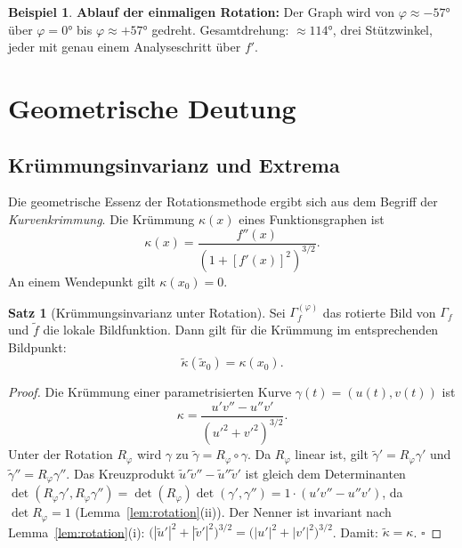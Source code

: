 ﻿\documentclass[12pt, a4paper]{article}
\theoremstyle{definition}
\newtheorem{satz}{Satz}[section]
\newtheorem{beispiel}{Beispiel}[section]
\begin{document}
\begin{beispiel}
		\textbf{Ablauf der einmaligen Rotation:}
		Der Graph wird von $\varphi \approx -57 °$ über $\varphi = 0 °$ bis
		$\varphi \approx +57 °$ gedreht. Gesamtdrehung: $\approx 114 °$,
		drei Stützwinkel, jeder mit genau einem Analyseschritt über $f'$.
	\end{beispiel}
	
	\section{Geometrische Deutung}
	
	\subsection{Krümmungsinvarianz und Extrema}
	
	Die geometrische Essenz der Rotationsmethode ergibt sich aus dem Begriff der
	\emph{Kurvenkrimmung}. Die Krümmung $\kappa(x)$ eines Funktionsgraphen ist
	\[
	\kappa(x) = \frac{f''(x)}{\left(1 + [f'(x)]^2\right)^{3/2}}.
	\]
	An einem Wendepunkt gilt $\kappa(x_0) = 0$.
	
	\begin{satz}[Krümmungsinvarianz unter Rotation]
		\label{satz:kruemmung}
		Sei $\Gamma_f^{(\varphi)}$ das rotierte Bild von $\Gamma_f$ und $\tilde{f}$
		die lokale Bildfunktion. Dann gilt für die Krümmung im entsprechenden Bildpunkt:
		\[
		\tilde{\kappa}(\tilde{x}_0) = \kappa(x_0).
		\]
	\end{satz}
	
	\begin{proof}
		Die Krümmung einer parametrisierten Kurve $\gamma(t) = (u(t), v(t))$ ist
		\[
		\kappa = \frac{u'v'' - u''v'}{(u'^2 + v'^2)^{3/2}}.
		\]
		Unter der Rotation $R_\varphi$ wird $\gamma$ zu $\tilde{\gamma} = R_\varphi \circ \gamma$.
		Da $R_\varphi$ linear ist, gilt $\tilde{\gamma}' = R_\varphi \gamma'$ und
		$\tilde{\gamma}'' = R_\varphi \gamma''$. Das Kreuzprodukt
		$\tilde{u}'\tilde{v}'' - \tilde{u}''\tilde{v}'$ ist gleich dem Determinanten
		$\det(R_\varphi \gamma', R_\varphi \gamma'') = \det(R_\varphi)\det(\gamma', \gamma'')
		= 1 \cdot (u'v'' - u''v')$, da $\det R_\varphi = 1$ (Lemma~\ref{lem:rotation}(ii)).
		Der Nenner ist invariant nach Lemma~\ref{lem:rotation}(i):
		$\bigl(|\tilde{u}'|^2 + |\tilde{v}'|^2\bigr)^{3/2} = \bigl(|u'|^2 + |v'|^2\bigr)^{3/2}$.
		Damit: $\tilde{\kappa} = \kappa$. $\square$
	\end{proof}
	
\end{document}
